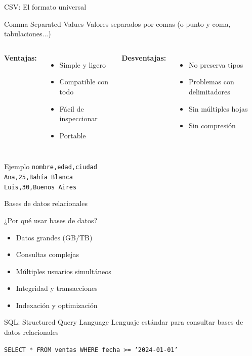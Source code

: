 \documentclass[aspectratio=169]{beamer}
\begin{document}
\begin{frame}{CSV: El formato universal}
\begin{block}{Comma-Separated Values}
Valores separados por comas (o punto y coma, tabulaciones...)
\end{block}

\begin{columns}[t]
\textbf{Ventajas:}
\begin{itemize}
    \item Simple y ligero
    \item Compatible con todo
    \item Fácil de inspeccionar
    \item Portable
\end{itemize}

\textbf{Desventajas:}
\begin{itemize}
    \item No preserva tipos
    \item Problemas con delimitadores
    \item Sin múltiples hojas
    \item Sin compresión
\end{itemize}
\end{columns}

\vspace{1em}
\begin{exampleblock}{Ejemplo}
\texttt{nombre,edad,ciudad}\\
\texttt{Ana,25,Bahía Blanca}\\
\texttt{Luis,30,Buenos Aires}
\end{exampleblock}
\end{frame}

\begin{frame}{Bases de datos relacionales}
\begin{block}{¿Por qué usar bases de datos?}
\begin{itemize}
    \item Datos grandes (GB/TB)
    \item Consultas complejas
    \item Múltiples usuarios simultáneos
    \item Integridad y transacciones
    \item Indexación y optimización
\end{itemize}
\end{block}

\pause

\begin{alertblock}{SQL: Structured Query Language}
Lenguaje estándar para consultar bases de datos relacionales

\texttt{SELECT * FROM ventas WHERE fecha >= '2024-01-01'}
\end{alertblock}
\end{frame}
\end{document}
